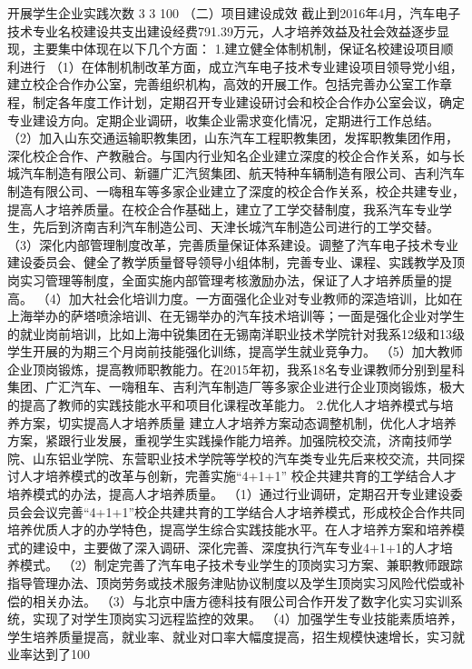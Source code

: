 开展学生企业实践次数
3
3
100%
（二）项目建设成效
截止到2016年4月，汽车电子技术专业名校建设共支出建设经费791.39万元，人才培养效益及社会效益逐步显现，主要集中体现在以下几个方面：
1.建立健全体制机制，保证名校建设项目顺利进行
（1）在体制机制改革方面，成立汽车电子技术专业建设项目领导党小组，建立校企合作办公室，完善组织机构，高效的开展工作。包括完善办公室工作章程，制定各年度工作计划，定期召开专业建设研讨会和校企合作办公室会议，确定专业建设方向。定期企业调研，收集企业需求变化情况，定期进行工作总结。
（2）加入山东交通运输职教集团，山东汽车工程职教集团，发挥职教集团作用，深化校企合作、产教融合。与国内行业知名企业建立深度的校企合作关系，如与长城汽车制造有限公司、新疆广汇汽贸集团、航天特种车辆制造有限公司、吉利汽车制造有限公司、一嗨租车等多家企业建立了深度的校企合作关系，校企共建专业，提高人才培养质量。在校企合作基础上，建立了工学交替制度，我系汽车专业学生，先后到济南吉利汽车制造公司、天津长城汽车制造公司进行的工学交替。
（3）深化内部管理制度改革，完善质量保证体系建设。调整了汽车电子技术专业建设委员会、健全了教学质量督导领导小组体制，完善专业、课程、实践教学及顶岗实习管理等制度，全面实施内部管理考核激励办法，保证了人才培养质量的提高。
（4）加大社会化培训力度。一方面强化企业对专业教师的深造培训，比如在上海举办的萨塔喷涂培训、在无锡举办的汽车技术培训等；一面是强化企业对学生的就业岗前培训，比如上海中锐集团在无锡南洋职业技术学院针对我系12级和13级学生开展的为期三个月岗前技能强化训练，提高学生就业竞争力。
（5）加大教师企业顶岗锻炼，提高教师职教能力。在2015年初，我系18名专业课教师分别到星科集团、广汇汽车、一嗨租车、吉利汽车制造厂等多家企业进行企业顶岗锻炼，极大的提高了教师的实践技能水平和项目化课程改革能力。
2.优化人才培养模式与培养方案，切实提高人才培养质量
建立人才培养方案动态调整机制，优化人才培养方案，紧跟行业发展，重视学生实践操作能力培养。加强院校交流，济南技师学院、山东铝业学院、东营职业技术学院等学校的汽车类专业先后来校交流，共同探讨人才培养模式的改革与创新，完善实施“4+1+1” 校企共建共育的工学结合人才培养模式的办法，提高人才培养质量。
（1）通过行业调研，定期召开专业建设委员会会议完善“4+1+1”校企共建共育的工学结合人才培养模式，形成校企合作共同培养优质人才的办学特色，提高学生综合实践技能水平。在人才培养方案和培养模式的建设中，主要做了深入调研、深化完善、深度执行汽车专业4+1+1的人才培养模式。
（2）制定完善了汽车电子技术专业学生的顶岗实习方案、兼职教师跟踪指导管理办法、顶岗劳务或技术服务津贴协议制度以及学生顶岗实习风险代偿或补偿的相关办法。
（3）与北京中唐方德科技有限公司合作开发了数字化实习实训系统，实现了对学生顶岗实习远程监控的效果。
（4）加强学生专业技能素质培养，学生培养质量提高，就业率、就业对口率大幅度提高，招生规模快速增长，实习就业率达到了100%
